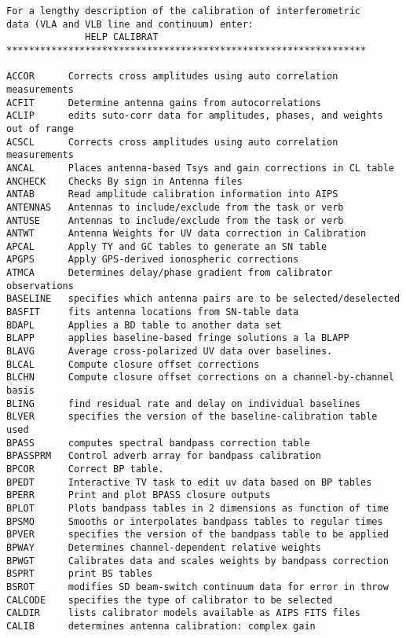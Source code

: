 \vskip 0.5pt
\bbve\begin{verbatim}
For a lengthy description of the calibration of interferometric
data (VLA and VLB line and continuum) enter:
              HELP CALIBRAT
****************************************************************

ACCOR      Corrects cross amplitudes using auto correlation measurements
ACFIT      Determine antenna gains from autocorrelations
ACLIP      edits suto-corr data for amplitudes, phases, and weights out of range
ACSCL      Corrects cross amplitudes using auto correlation measurements
ANCAL      Places antenna-based Tsys and gain corrections in CL table
ANCHECK    Checks By sign in Antenna files
ANTAB      Read amplitude calibration information into AIPS
ANTENNAS   Antennas to include/exclude from the task or verb
ANTUSE     Antennas to include/exclude from the task or verb
ANTWT      Antenna Weights for UV data correction in Calibration
APCAL      Apply TY and GC tables to generate an SN table
APGPS      Apply GPS-derived ionospheric corrections
ATMCA      Determines delay/phase gradient from calibrator observations
BASELINE   specifies which antenna pairs are to be selected/deselected
BASFIT     fits antenna locations from SN-table data
BDAPL      Applies a BD table to another data set
BLAPP      applies baseline-based fringe solutions a la BLAPP
BLAVG      Average cross-polarized UV data over baselines.
BLCAL      Compute closure offset corrections
BLCHN      Compute closure offset corrections on a channel-by-channel basis
BLING      find residual rate and delay on individual baselines
BLVER      specifies the version of the baseline-calibration table used
BPASS      computes spectral bandpass correction table
BPASSPRM   Control adverb array for bandpass calibration
BPCOR      Correct BP table.
BPEDT      Interactive TV task to edit uv data based on BP tables
BPERR      Print and plot BPASS closure outputs
BPLOT      Plots bandpass tables in 2 dimensions as function of time
BPSMO      Smooths or interpolates bandpass tables to regular times
BPVER      specifies the version of the bandpass table to be applied
BPWAY      Determines channel-dependent relative weights
BPWGT      Calibrates data and scales weights by bandpass correction
BSPRT      print BS tables
BSROT      modifies SD beam-switch continuum data for error in throw
CALCODE    specifies the type of calibrator to be selected
CALDIR     lists calibrator models available as AIPS FITS files
CALIB      determines antenna calibration: complex gain

\end{verbatim}
